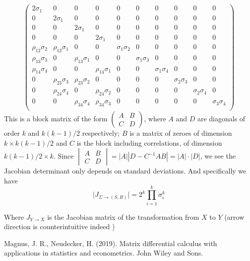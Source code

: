 \documentclass{article}
\begin{document}
$$
\begin{pmatrix}
2 \sigma_1 & 0 & 0 & 0 & 0 & 0 & 0 & 0 & 0 & 0 \\ 
0 & 2 \sigma_1 & 0 & 0 & 0 & 0 & 0 & 0 & 0 & 0 \\ 
0 & 0 & 2 \sigma_1 & 0 & 0 & 0 & 0 & 0 & 0 & 0 \\ 
0 & 0 & 0 & 2 \sigma_1 & 0 & 0 & 0 & 0 & 0 & 0 \\ 
\rho_{12} \sigma_2 & \rho_{12} \sigma_1 & 0 & 0 & \sigma_1 \sigma_2 & 0 & 0 & 0 & 0 & 0 \\
\rho_{13} \sigma_3 & 0 &\rho_{13} \sigma_1  & 0 &  0 & \sigma_1 \sigma_3 & 0 & 0 & 0 & 0 \\
\rho_{14} \sigma_4 & 0 & 0 &  \rho_{14} \sigma_1 & 0 & 0 & \sigma_1 \sigma_4 & 0 & 0 & 0  \\
0 & \rho_{23} \sigma_3 & \rho_{23} \sigma_2 & 0 & 0 & 0 & 0 & \sigma_2 \sigma_3 & 0 & 0 \\
0 & \rho_{24} \sigma_4 & 0 & \rho_{24} \sigma_2 & 0 & 0 & 0 & 0 & \sigma_2 \sigma_4 & 0 \\
0 & 0 & \rho_{34} \sigma_4 & \rho_{34} \sigma_3 & 0 & 0 & 0 & 0 & 0 & \sigma_3 \sigma_4 \\
\end{pmatrix}
$$
This is a block matrix of the form $\begin{pmatrix} A & B \\ C & D\end{pmatrix}$, where $A$ and $D$ are diagonals of order $k$ and $k(k-1)/2$ respectively; $B$ is a matrix of zeroes of dimension $k \times k(k-1)/2$ and $C$ is the block including correlations, of dimension $k(k-1)/2 \times k$. Since $\begin{vmatrix} A & B \\ C & D\end{vmatrix} = |A| |D - C^{-1}AB| = |A| \cdot |D|$,  we see the Jacobian determinant only depends on standard deviations. And specifically we have
\begin{equation}
\mid J_{\Sigma \rightarrow(S,R)}\mid = 2^k \prod_{i=1}^k \sigma_i^k
\end{equation}

Where $J_{Y \rightarrow X}$ is the Jacobian matrix of the transformation from $X$ to $Y$ (arrow direction is counterintuitive indeed )

\begin{thebibliography}{6}
 Magnus, J. R., Neudecker, H. (2019). Matrix differential calculus with applications in statistics and econometrics. John Wiley and Sons.
\end{thebibliography}
\end{document}
